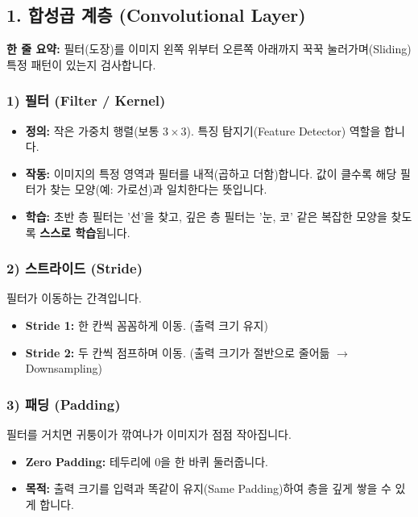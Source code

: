 \documentclass[11pt,a4paper]{book}
\theoremstyle{definition}
\begin{document}
\subsection{1. 합성곱 계층 (Convolutional Layer)}


\begin{conceptbox}[title={개념 1: 도장 찍기 (Sliding Window)}]
\textbf{한 줄 요약:} 필터(도장)를 이미지 왼쪽 위부터 오른쪽 아래까지 꾹꾹 눌러가며(Sliding) 특정 패턴이 있는지 검사합니다.
\end{conceptbox}

\subsubsection*{1) 필터 (Filter / Kernel)}
\begin{itemize}
    \item \textbf{정의:} 작은 가중치 행렬(보통 $3 \times 3$). 특징 탐지기(Feature Detector) 역할을 합니다.
    \item \textbf{작동:} 이미지의 특정 영역과 필터를 내적(곱하고 더함)합니다. 값이 클수록 해당 필터가 찾는 모양(예: 가로선)과 일치한다는 뜻입니다.
    \item \textbf{학습:} 초반 층 필터는 '선'을 찾고, 깊은 층 필터는 '눈, 코' 같은 복잡한 모양을 찾도록 \textbf{스스로 학습}됩니다.
\end{itemize}

\subsubsection*{2) 스트라이드 (Stride)}
필터가 이동하는 간격입니다.
\begin{itemize}
    \item \textbf{Stride 1:} 한 칸씩 꼼꼼하게 이동. (출력 크기 유지)
    \item \textbf{Stride 2:} 두 칸씩 점프하며 이동. (출력 크기가 절반으로 줄어듦 $\to$ Downsampling)
\end{itemize}

\subsubsection*{3) 패딩 (Padding)}
필터를 거치면 귀퉁이가 깎여나가 이미지가 점점 작아집니다.
\begin{itemize}
    \item \textbf{Zero Padding:} 테두리에 0을 한 바퀴 둘러줍니다.
    \item \textbf{목적:} 출력 크기를 입력과 똑같이 유지(Same Padding)하여 층을 깊게 쌓을 수 있게 합니다.
\end{itemize}
\end{document}
